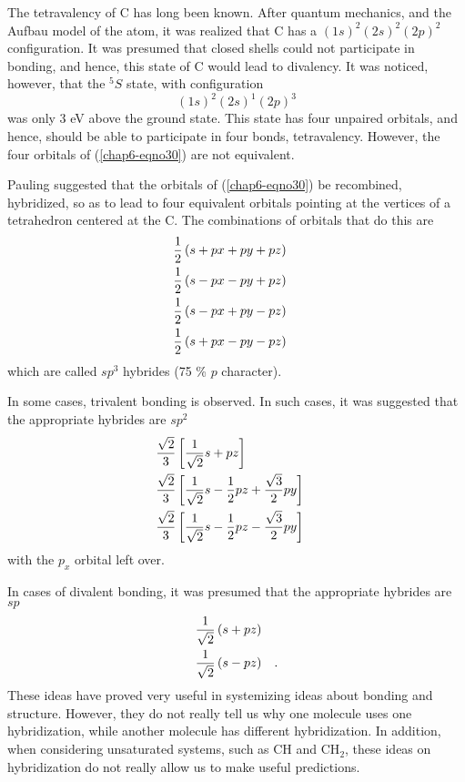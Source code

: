 The tetravalency of C has long been known.  After quantum mechanics, 
and the Aufbau model of the atom, it was realized that C has a 
$(1s)^2(2s)^2(2p)^2$ configuration.  It was presumed that closed 
shells could not participate in bonding, and hence, this state of C 
would lead to divalency.  It was noticed, however, that the ${^5S}$ 
state, with configuration
\begin{equation}
(1s)^2(2s)^1(2p)^3
\label{chap6-eqno30}
\end{equation}
was only 3 eV above the ground state.  This state has four unpaired
orbitals, and hence, should be able to participate in four bonds,
tetravalency.  However, the four orbitals of (\ref{chap6-eqno30}) are
not equivalent.

Pauling suggested that the orbitals of (\ref{chap6-eqno30}) be
recombined, hybridized, so as to lead to four equivalent orbitals
pointing at the vertices of a tetrahedron centered at the C.  The
combinations of orbitals that do this are
\begin{eqnarray}
&{1 \over 2} \left( s + px + py + pz \right)& \cr
&{1 \over 2} \left( s - px - py + pz \right)& \cr
&{1 \over 2} \left( s - px + py - pz \right)& \cr
&{1 \over 2} \left( s + px - py - pz \right)& 
\end{eqnarray}
which are called $sp^3$ hybrides (75 \% $p$ character).

In some cases, trivalent bonding is observed.  In such cases, it was 
suggested that the appropriate hybrides are $sp^2$
\begin{eqnarray}
&{\sqrt{2} \over 3} \left[ {1 \over \sqrt{2}} s + pz \right]&\cr
&{\sqrt{2} \over 3} \left[ {1 \over \sqrt{2}} s - {1 \over 2} pz +  
{\sqrt{3} \over 2} py \right]&\cr
&{\sqrt{2} \over 3} \left[ {1 \over \sqrt{2}} s - {1 \over 2} pz - 
{\sqrt{3} \over 2} py \right]&
\end{eqnarray}
with the $p_x$ orbital left over.

In cases of divalent bonding, it was presumed that the appropriate 
hybrides are $sp$
\begin{eqnarray}
&{1 \over \sqrt{2}} \left( s + pz \right)& \cr
&{1 \over \sqrt{2}} \left( s - pz \right)& .
\end{eqnarray}
These ideas have proved very useful in systemizing ideas about bonding 
and structure.  However, they do not really tell us why one molecule 
uses one hybridization, while another molecule has different 
hybridization.  In addition, when considering unsaturated systems, 
such as CH and CH$_2$, these ideas on hybridization do not really 
allow us to make useful predictions.

